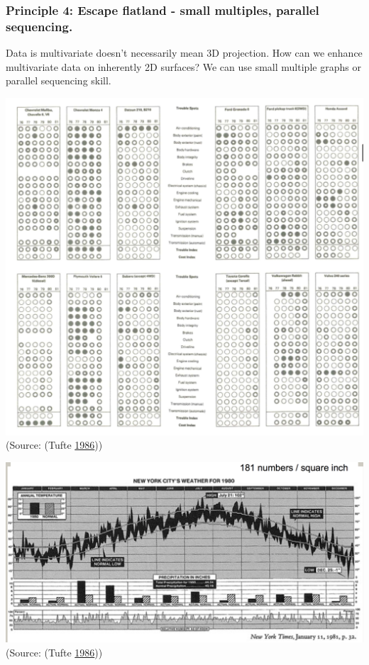\documentclass[]{book}
\begin{document}
\hypertarget{principle-4-escape-flatland---small-multiples-parallel-sequencing.}{%
\subsubsection{Principle 4: Escape flatland - small multiples, parallel sequencing.}\label{principle-4-escape-flatland---small-multiples-parallel-sequencing.}}

Data is multivariate doesn't necessarily mean 3D projection. How can we enhance multivariate data on inherently 2D surfaces? We can use small multiple graphs or parallel sequencing skill.

\includegraphics{images/Tufte_figure8.png}
(Source: (Tufte \protect\hyperlink{ref-The-Visual-Display-of-Quantitative-Information}{1986}))

\includegraphics{images/Tufte_figure7.png}
(Source: (Tufte \protect\hyperlink{ref-The-Visual-Display-of-Quantitative-Information}{1986}))
\end{document}
